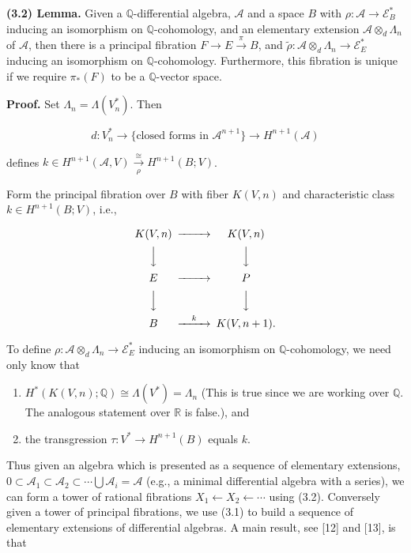 \documentclass[
  english,
  a3paper,
  a3paper]{extarticle}
\begin{document}
\textbf{(3.2) Lemma.} Given a \(\mathbb Q\)-differential algebra,
\(\mathcal A\) and a space \(B\) with
\(\rho:\mathcal A\to\mathcal E_B^*\) inducing an isomorphism on
\(\mathbb Q\)-cohomology, and an elementary extension
\(\mathcal A\otimes_d\Lambda_n\) of \(\mathcal A\), then there is a
principal fibration \(F\to E\xrightarrow{\pi}B\), and
\(\widetilde\rho:\mathcal A\otimes_d\Lambda_n\to\mathcal E_E^*\)
inducing an isomorphism on \(\mathbb Q\)-cohomology. Furthermore, this
fibration is unique if we require \(\pi_*(F)\) to be a
\(\mathbb Q\)-vector space.

\textbf{Proof.} Set \(\Lambda_n=\Lambda(V_n^*)\). Then

\[d:V_n^*\to\{\text{closed forms in }\mathcal A^{n+1}\}\to H^{n+1}(\mathcal A)\]

defines
\(k\in H^{n+1}(\mathcal A,V)\xrightarrow[\rho]{\cong}H^{n+1}(B;V)\).

Form the principal fibration over \(B\) with fiber \(K(V,n)\) and
characteristic class \(k\in H^{n+1}(B;V)\), i.e.,

\[\begin{CD}K(V,n)@>>>K(V,n)\\@VVV@VVV\\E@>>>P\\@VVV@VVV\\B@>{k}>>K(V,n+1).\end{CD}\]

To define \(\rho:\mathcal A\otimes_d\Lambda_n\to\mathcal E_E^*\)
inducing an isomorphism on \(\mathbb Q\)-cohomology, we need only know
that

\begin{enumerate}
\def\labelenumi{\arabic{enumi})}
\item
  \(H^*(K(V,n);\mathbb Q)\cong\Lambda(V^*)=\Lambda_n\) (This is true
  since we are working over \(\mathbb Q\). The analogous statement over
  \(\mathbb R\) is false.), and
\item
  the transgression \(\tau:V^*\to H^{n+1}(B)\) equals \(k\).
\end{enumerate}

Thus given an algebra which is presented as a sequence of elementary
extensions,
\(0\subset\mathcal A_1\subset\mathcal A_2\subset\cdots\bigcup\mathcal A_i=\mathcal A\)
(e.g., a minimal differential algebra with a series), we can form a
tower of rational fibrations \(X_1\leftarrow X_2\leftarrow\cdots\) using
(3.2). Conversely given a tower of principal fibrations, we use (3.1) to
build a sequence of elementary extensions of differential algebras. A
main result, see {[}12{]} and {[}13{]}, is that
\end{document}
